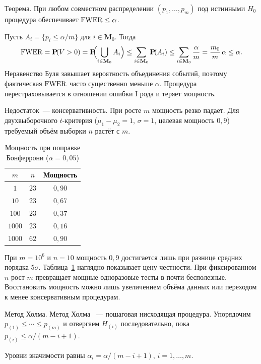 Теорема. При любом совместном распределении $(p_1,\ldots,p_m)$ под истинными $H_0$ процедура обеспечивает $\operatorname{FWER}\leq\alpha$.
\begin{remark}
Пусть $A_i=\{p_i\leq\alpha/m\}$ для $i\in\mathbf{M}_0$.
Тогда
\[ \operatorname{FWER}=\operatorname{\mathbf{P}\!}(V>0)=\operatorname{\mathbf{P}\!}\!\Bigl(\bigcup_{i\in\mathbf{M}_0} A_i\Bigr) \leq\sum_{i\in\mathbf{M}_0}\operatorname{\mathbf{P}\!}(A_i)\leq\sum_{i\in\mathbf{M}_0}\frac{\alpha}{m} =\frac{m_0}{m}\,\alpha\leq\alpha.
\]
Неравенство Буля завышает вероятность объединения событий, поэтому фактическая $\operatorname{FWER}$ часто существенно меньше $\alpha$. Процедура перестраховывается в отношении ошибки I рода и теряет мощность.
\end{remark}

Недостаток~--- консервативность. При росте $m$ мощность резко падает. Для двухвыборочного $t$-критерия ($\mu_1-\mu_2=1$, $\sigma=1$, целевая мощность $0{,}9$) требуемый объём выборки $n$ растёт с $m$.

\begin{table}[htbp]
    \centering
    \caption{Мощность при поправке Бонферрони ($\alpha=0{,}05$)}
    \label{tab:bonf-power}
    \begin{tabular}{|c|c|c|}
        \hline
        $m$ & $n$ & Мощность \\
        \hline
        $1$   & $23$  & $0{,}90$ \\
        $10$  & $23$  & $0{,}67$ \\
        $100$ & $23$  & $0{,}37$ \\
        $1000$& $23$  & $0{,}16$ \\
        $1000$& $62$  & $0{,}90$ \\
        \hline
    \end{tabular}
\end{table}

При $m=10^6$ и $n=10$ мощность $0{,}9$ достигается лишь при разнице средних порядка $5\sigma$.
Таблица~\ref{tab:bonf-power} наглядно показывает цену честности. При фиксированном $n$ рост $m$ превращает мощные одноразовые тесты в почти бесполезные. Восстановить мощность можно лишь увеличением объёма данных или переходом к менее консервативным процедурам.

Метод Холма. Метод Холма \citep{holm1979}~--- пошаговая нисходящая процедура.
Упорядочим $p_{(1)}\leq\cdots\leq p_{(m)}$ и отвергаем $H_{(i)}$ последовательно, пока $p_{(i)}\leq \alpha/(m-i+1)$.

Уровни значимости равны $\alpha_i=\alpha/(m-i+1)$, $i=1,\ldots,m$.

